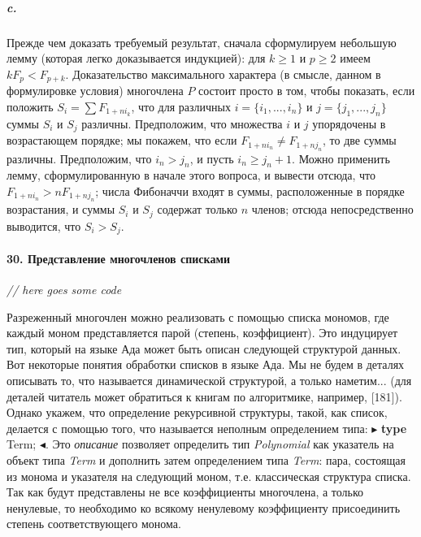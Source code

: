 \documentclass{../../template/mai_book}
\begin{document}
\subparagraph{c.} Прежде чем доказать требуемый результат, сначала сформулируем небольшую лемму (которая легко доказывается индукцией): для $k \geqslant 1$ и $p \geqslant 2$ имеем $kF_p < F_{p + k}$. Доказательство максимального характера (в смысле, данном в формулировке условия) многочлена $P$ состоит просто в том, чтобы показать, если положить $S_i = \sum F_{1 + ni_k}$, что для различных $i = \{i_1,...,i_n\}$ и $j = \{j_1,...,j_n\}$ суммы $S_i$ и $S_j$ различны. Предположим, что множества $i$ и $j$ упорядочены в возрастающем порядке; мы покажем, что если $F_{1 + ni_n} \neq F_{1 + nj_n}$, то две суммы различны. Предположим, что $i_n > j_n$, и пусть $i_n \geqslant j_n + 1$. Можно применить лемму, сформулированную в начале этого вопроса, и вывести отсюда, что $F_{1 + ni_n} > nF_{1 + nj_n}$; числа Фибоначчи входят в суммы, расположенные в порядке возрастания, и суммы $S_i$ и $S_j$ содержат только $n$ членов; отсюда непосредственно выводится, что $S_i > S_j$.

\newpage


\paragraph{30. Представление многочленов списками}

\textit{// here goes some code}

Разреженный многочлен можно реализовать с помощью списка мономов, где каждый моном представляется парой (степень, коэффициент). Это индуцирует тип, который на языке Ада может быть описан следующей структурой данных. Вот некоторые понятия обработки списков в языке Ада. Мы не будем в деталях описывать то, что называется динамической структурой, а только наметим... (для деталей читатель может обратиться к книгам по алгоритмике, например, [181]). Однако укажем, что определение рекурсивной структуры, такой, как список, делается с помощью того, что называется неполным определением типа: $\blacktriangleright$ \textbf{type} Term; $\blacktriangleleft$. Это \textit{описание} позволяет определить тип \textit{Polynomial} как указатель на объект типа \textit{Term} и дополнить затем определением типа \textit{Term}: пара, состоящая из монома и указателя на следующий моном, т.е. классическая структура списка. Так как будут представлены не все коэффициенты многочлена, а только ненулевые, то необходимо ко всякому ненулевому коэффициенту присоединить степень соответствующего монома.
\end{document}
